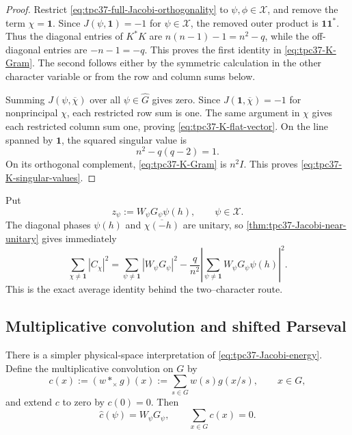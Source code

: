 \begin{proof}
Restrict \eqref{eq:tpc37-full-Jacobi-orthogonality} to
\(\psi,\phi\in\mathscr X\), and remove the term
\(\chi=\mathbf1\).  Since
\(J(\psi,\mathbf1)=-1\) for \(\psi\in\mathscr X\), the removed outer
product is \(\mathbf1\mathbf1^*\).  Thus the diagonal entries of
\(K^*K\) are \(n(n-1)-1=n^2-q\), while the off-diagonal entries are
\(-n-1=-q\).  This proves the first identity in
\eqref{eq:tpc37-K-Gram}.  The second follows either by the symmetric
calculation in the other character variable or from the row and column
sums below.

Summing \(J(\psi,\overline\chi)\) over all \(\psi\in\widehat G\) gives
zero.  Since \(J(\mathbf1,\overline\chi)=-1\) for nonprincipal
\(\chi\), each restricted row sum is one.  The same argument in
\(\chi\) gives each restricted column sum one, proving
\eqref{eq:tpc37-K-flat-vector}.  On the line spanned by \(\mathbf1\),
the squared singular value is
\[
 n^2-q(q-2)=1.
\]
On its orthogonal complement, \eqref{eq:tpc37-K-Gram} is \(n^2I\).
This proves \eqref{eq:tpc37-K-singular-values}.
\end{proof}

Put
\begin{equation}
 z_\psi:=W_\psi G_\psi\psi(h),
 \qquad \psi\in\mathscr X.
 \label{eq:tpc37-zpsi}
\end{equation}
The diagonal phases \(\psi(h)\) and \(\overline{\chi(-h)}\) are unitary,
so \cref{thm:tpc37-Jacobi-near-unitary} gives immediately
\begin{equation}
 \boxed{
 \sum_{\chi\ne\mathbf1}|C_\chi|^2
 =\sum_{\psi\ne\mathbf1}|W_\psi G_\psi|^2
 -\frac q{n^2}
 \left|\sum_{\psi\ne\mathbf1}
 W_\psi G_\psi\psi(h)\right|^2.}
 \label{eq:tpc37-Jacobi-energy}
\end{equation}
This is the exact average identity behind the two--character route.

\subsection{Multiplicative convolution and shifted Parseval}

There is a simpler physical-space interpretation of
\eqref{eq:tpc37-Jacobi-energy}.  Define the multiplicative convolution
on \(G\) by
\begin{equation}
 c(x):=(w*_{\times}g)(x)
 :=\sum_{s\in G}w(s)g(x/s),
 \qquad x\in G,
 \label{eq:tpc37-multiplicative-convolution}
\end{equation}
and extend \(c\) to zero by \(c(0)=0\).  Then
\begin{equation}
 \widehat c(\psi)=W_\psi G_\psi,
 \qquad
 \sum_{x\in G}c(x)=0.
 \label{eq:tpc37-c-transform-centered}
\end{equation}

